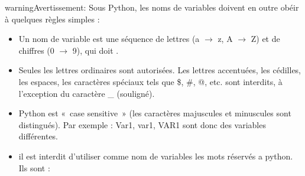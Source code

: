 \documentclass[letterpaper,10pt,french]{sphinxmanual}
\begin{document}
\begin{sphinxadmonition}{warning}{Avertissement:}
\sphinxAtStartPar
Sous Python, les noms de variables doivent en outre obéir à quelques règles simples :
\begin{itemize}
\item {} 
\sphinxAtStartPar
Un nom de variable est une séquence de lettres (a \(\rightarrow\) z, A \(\rightarrow\) Z) et de chiffres (0 \(\rightarrow\) 9), qui doit
.

\item {} 
\sphinxAtStartPar
Seules les lettres ordinaires sont autorisées. Les lettres accentuées, les cédilles, les espaces, les caractères spéciaux tels que \$, \#, @, etc. sont interdits, à l’exception du caractère \_ (souligné).

\item {} 
\sphinxAtStartPar
Python est « case sensitive » (les caractères majuscules et minuscules sont distingués). Par exemple : Var1, var1, VAR1 sont donc des variables différentes.

\item {} 
\sphinxAtStartPar
il est interdit d’utiliser comme nom de variables les mots réservés a python. Ils sont :

\end{itemize}
\end{sphinxadmonition}
\end{document}
